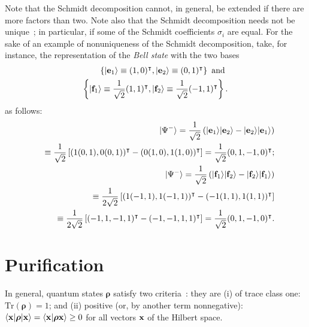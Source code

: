 Note that the Schmidt decomposition cannot, in general, be extended if there are more factors than two.
Note also that the Schmidt decomposition needs not be unique~\cite{ekert:415};
in particular, if some of the Schmidt coefficients $\sigma_i$ are equal.
For the sake of an example of nonuniqueness of the Schmidt decomposition,
take, for instance, the representation of the {\em Bell state} 
with the two bases
\begin{equation}
\begin{split}
\left\{
\vert {\bf e}_1\rangle \equiv (1,0)^\intercal ,
\vert {\bf e}_2\rangle \equiv (0,1)^\intercal
\right\}
\textrm{ and }\\
\left\{
\vert {\bf f}_1\rangle \equiv \frac{1}{\sqrt{2}}(1,1)^\intercal ,
\vert {\bf f}_2\rangle \equiv \frac{1}{\sqrt{2}}(-1,1)^\intercal
\right\}.
\end{split}
\end{equation}
as follows:
\begin{equation}
\begin{split}
\vert {\Psi^-} \rangle =
\frac{1}{\sqrt{2}}
\left(
\vert {\bf e}_1\rangle
\vert {\bf e}_2\rangle
-
\vert {\bf e}_2\rangle
\vert {\bf e}_1\rangle
\right)\\
\quad \equiv
\frac{1}{\sqrt{2}}
\left[
(1 (0,1),0(0,1))^\intercal - (0 (1,0),1(1,0))^\intercal \right] = \frac{1}{\sqrt{2}} (0,1,-1,0)^\intercal ; \\
\vert {\Psi^-} \rangle =
\frac{1}{\sqrt{2}}
\left(
\vert {\bf f}_1\rangle
\vert {\bf f}_2\rangle
-
\vert {\bf f}_2\rangle
\vert {\bf f}_1\rangle
\right) \\
\quad \equiv
\frac{1}{2\sqrt{2}}
\left[
(1 (-1,1),1(-1,1))^\intercal - ( -1 (1,1),1(1,1))^\intercal \right]  \\
\quad \equiv
\frac{1}{2\sqrt{2}}
\left[
( -1  , 1 ,-1 ,1 )^\intercal  - ( -1,-1 ,1 ,1 )^\intercal \right]
 = \frac{1}{\sqrt{2}} (0,1,-1,0)^\intercal
.
\end{split}
\end{equation}



\section{Purification}
\label{2015-m-ch-fdvs-purification}


In general, quantum states ${\boldsymbol{\rho}}$ satisfy two criteria~\cite{ba-89}:  they are
(i) of trace class one:
$\textrm{Tr}({\boldsymbol{\rho}}) =1$;
and
(ii) positive (or, by another term nonnegative):
$
\langle {\bf x} \vert {\boldsymbol{\rho}} \vert {\bf x} \rangle
=\langle {\bf x} \vert {\boldsymbol{\rho}}  {\bf x} \rangle \ge  0
$ for all vectors ${\bf x}$ of the  Hilbert space.

